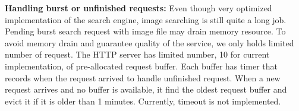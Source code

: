 \textbf{Handling burst or unfinished requests:}
Even though very optimized implementation of the search engine, image searching is still quite a long job.
Pending burst search request with image file may drain memory resource.
To avoid memory drain and guarantee quality of the service, we only holds limited number of request.
The HTTP server has limited number, 10 for current implementation, of pre-allocated request buffer.
Each buffer has timer that records when the request arrived to handle unfinished request.
When a new request arrives and no buffer is available, it find the oldest request buffer and evict it if it is older than 1 minutes.
Currently, timeout is not implemented.
